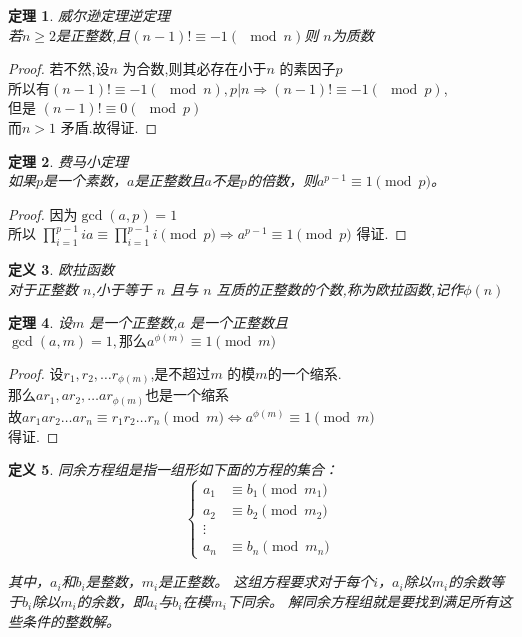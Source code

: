 \documentclass[12pt, a4paper, oneside]{ctexbook}
\newtheorem{theorem}{定理}[section]
\newtheorem{definition}[theorem]{定义}
\begin{document}
\begin{theorem}
  威尔逊定理逆定理\\
  若$n\geq 2$是正整数,且$(n-1)! \equiv -1 (\mod n)$则 $n$为质数
\end{theorem}

\begin{proof}
  若不然,设$n$ 为合数,则其必存在小于$n$ 的素因子$p$\\
所以有$(n-1)! \equiv -1 (\mod n),p|n \Rightarrow (n-1)! \equiv -1 (\mod p)$,\\
但是 $(n-1)! \equiv 0 (\mod p)$\\
而$n>1$ 矛盾.故得证.
\end{proof}

\begin{theorem}
  费马小定理\\
  如果$p$是一个素数，$a$是正整数且$a$不是$p$的倍数，则$a^{p-1} \equiv 1 \pmod{p}$。
\end{theorem}

\begin{proof}
  因为$\gcd(a,p)=1$\\
所以 $\prod_{i=1}^{p-1} ia \equiv \prod_{i=1}^{p-1} i \pmod{p} \Rightarrow a^{p-1} \equiv 1 \pmod{p}$ 得证.
\end{proof}

\begin{definition}
  欧拉函数\\
  对于正整数 $n$,小于等于 $n$ 且与 $n$ 互质的正整数的个数,称为欧拉函数,记作$\phi{(n)}$
\end{definition}

\begin{theorem}
  设$m$ 是一个正整数,$a$ 是一个正整数且$\gcd(a,m)=1,那么a^{\phi(m)} \equiv 1 \pmod{m}$
\end{theorem}

\begin{proof}
  设$r_1,r_2,\dots r_{\phi(m)}$,是不超过$m$ 的模$m$的一个缩系.\\
那么$ar_1,ar_2,\dots ar_{\phi(m)}$也是一个缩系\\
故$ar_1ar_2\dots ar_n \equiv r_1r_2\dots r_n \pmod{m} \iff a^{\phi(m)} \equiv 1 \pmod{m}$\\
得证.
\end{proof}

\begin{definition}
  同余方程组是指一组形如下面的方程的集合：
$$
\begin{cases}
a_1 &\equiv b_1 \pmod{m_1} \\
a_2 &\equiv b_2 \pmod{m_2} \\
\vdots \\
a_n &\equiv b_n \pmod{m_n}
\end{cases}
$$

其中，$a_i$和$b_i$是整数，$m_i$是正整数。
这组方程要求对于每个$i$，$a_i$除以$m_i$的余数等于$b_i$除以$m_i$的余数，即$a_i$与$b_i$在模$m_i$下同余。
解同余方程组就是要找到满足所有这些条件的整数解。
\end{definition}
\end{document}
